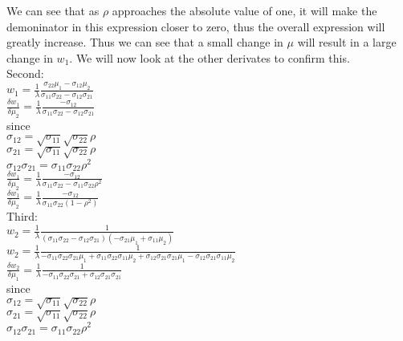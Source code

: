 \documentclass[11pt]{article}
\begin{document}
We can see that as $\rho$ approaches the absolute value of one, it will make the demoninator in this expression closer to zero, thus the overall expression will greatly increase. Thus we can see that a small change in $\mu$ will result in a large change in $w_{1}$. We will now look at the other derivates to confirm this.\\

Second:\\
$w_{1} = \frac{1}{\lambda} \frac{\sigma_{22} \mu_{1} - \sigma_{12} \mu_{2}}{\sigma_{11}\sigma_{22} - \sigma_{12}\sigma_{21}}$\\
$\frac{\delta w_{1}}{\delta \mu_{2}} = \frac{1}{\lambda} \frac{-\sigma_{12}}{\sigma_{11}\sigma_{22} - \sigma_{12}\sigma_{21}}$\\

since\\
$\sigma_{12} = \sqrt{\sigma_{11}} \sqrt{\sigma_{22}} \rho$\\
$\sigma_{21} = \sqrt{\sigma_{11}} \sqrt{\sigma_{22}} \rho$\\
$\sigma_{12} \sigma_{21} = \sigma_{11} \sigma_{22} \rho^{2}$\\

$\frac{\delta w_{1}}{\delta \mu_{2}} = \frac{1}{\lambda} \frac{-\sigma_{12}}{\sigma_{11}\sigma_{22} - \sigma_{11}\sigma_{22} \rho^{2}}$\\
$\frac{\delta w_{1}}{\delta \mu_{2}} = \frac{1}{\lambda} \frac{-\sigma_{12}}{\sigma_{11}\sigma_{22} (1 - \rho^{2})}$\\

Third:\\
$w_{2} = \frac{1}{\lambda} \frac{1}{(\sigma_{11}\sigma_{22} - \sigma_{12}\sigma_{21})(-\sigma_{21} \mu_{1} + \sigma_{11} \mu_{2})}$\\
$w_{2} = \frac{1}{\lambda} \frac{1}{-\sigma_{11}\sigma_{22}\sigma_{21}\mu_{1} + \sigma_{11}\sigma_{22}\sigma_{11}\mu_{2} + \sigma_{12}\sigma_{21}\sigma_{21}\mu_{1} - \sigma_{12}\sigma_{21}\sigma_{11}\mu_{2}}$\\
$\frac{\delta w_{2}}{\delta \mu_{1}} = \frac{1}{\lambda} \frac{1}{-\sigma_{11}\sigma_{22}\sigma_{21} + \sigma_{12}\sigma_{21}\sigma_{21}}$\\

since\\
$\sigma_{12} = \sqrt{\sigma_{11}} \sqrt{\sigma_{22}} \rho$\\
$\sigma_{21} = \sqrt{\sigma_{11}} \sqrt{\sigma_{22}} \rho$\\
$\sigma_{12} \sigma_{21} = \sigma_{11} \sigma_{22} \rho^{2}$\\
\end{document}
